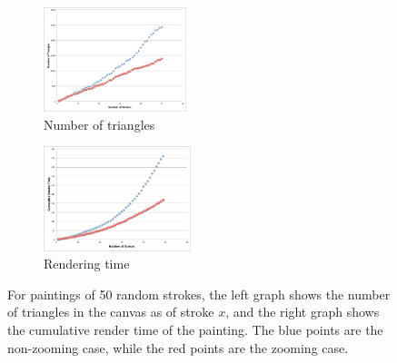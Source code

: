 \documentclass[review,draft]{acmsiggraph}
\begin{document}
\begin{figure}
  \centering
  \begin{subfigure}[b]{0.5\columnwidth}
    \centering
    \includegraphics[height=1.2in]{graphs/numtriangles}
    \caption{Number of triangles}
    \label{fig:numtriangles}
  \end{subfigure}%
  \begin{subfigure}[b]{0.5\columnwidth}
    \centering
    \includegraphics[height=1.2in]{graphs/cumulativetime}
    \caption{Rendering time}
    \label{fig:timing}
  \end{subfigure}%
  \caption{For paintings of 50 random strokes, the left graph shows the number of triangles in the canvas as of stroke $x$, and the right graph shows the cumulative render time of the painting. The blue points are the non-zooming case, while the red points are the zooming case.}
\end{figure}



\end{document}
